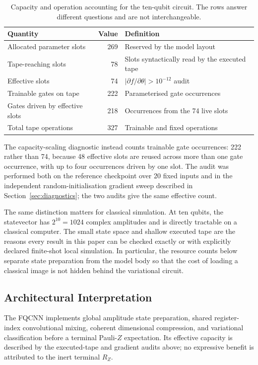 \documentclass[conference]{IEEEtran}
\begin{document}
\begin{table}[!t]
\caption{Capacity and operation accounting for the ten-qubit circuit. The rows answer different questions and are not interchangeable.}
\label{tab:capacity}
\centering
\small
\begin{tabular}{@{}p{}r p{}@{}}
\toprule
\textbf{Quantity} & \textbf{Value} & \textbf{Definition} \\
\midrule
Allocated parameter slots & 269 & Reserved by the model layout \\
Tape-reaching slots & 78 & Slots syntactically read by the executed tape \\
Effective slots & 74 & $|\partial f/\partial\theta|>10^{-12}$ audit \\
Trainable gates on tape & 222 & Parameterised gate occurrences \\
Gates driven by effective slots & 218 & Occurrences from the 74 live slots \\
Total tape operations & 327 & Trainable and fixed operations \\
\bottomrule
\end{tabular}
\end{table}

The capacity-scaling diagnostic instead counts trainable gate occurrences:
222 rather than 74, because 48 effective slots are reused across more than one
gate occurrence, with up to four occurrences driven by one slot. The audit was
performed both on
the reference checkpoint over 20 fixed inputs and in the
independent random-initialisation gradient sweep described in
Section~\ref{sec:diagnostics}; the two audits give the same effective count.

The same distinction matters for classical simulation. At ten qubits, the
statevector has $2^{10}=1024$ complex amplitudes and is directly tractable on a
classical computer. The small state space and shallow executed tape are the
reasons every result in this paper can be checked exactly or with explicitly
declared finite-shot local simulation.  In particular, the resource counts below separate
state preparation from the model body so that the cost of loading a classical
image is not hidden behind the variational circuit.

\subsection{Architectural Interpretation}
The FQCNN implements global amplitude state preparation, shared register-index convolutional mixing, coherent dimensional compression, and variational classification before a terminal Pauli-$Z$ expectation. Its effective capacity is described by the executed-tape and gradient audits above; no expressive benefit is attributed to the inert terminal $R_Z$.
\end{document}
